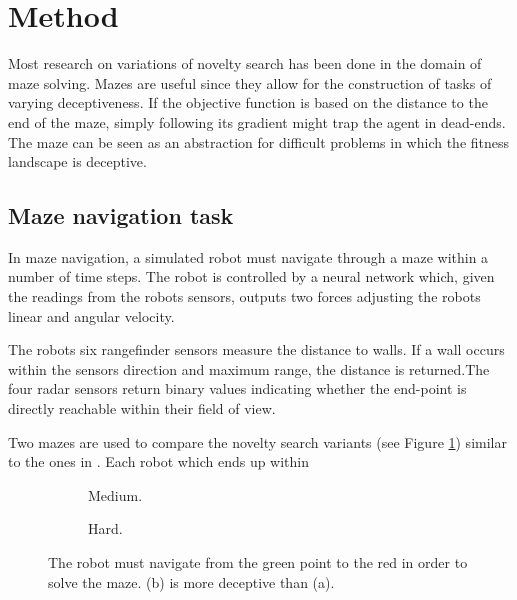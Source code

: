 \section{Method}
Most research on variations of novelty search has been done in the domain of maze solving. Mazes are useful
since they allow for the construction of tasks of varying deceptiveness. If the objective function is
based on the distance to the end of the maze, simply following its gradient might trap the agent in
dead-ends. The maze can be seen as an abstraction for difficult problems in which the fitness
landscape is deceptive.

\subsection{Maze navigation task}
In maze navigation, a simulated robot must navigate through a maze within a number of time steps.
The robot is controlled by a neural network which, given the readings from the robots sensors,
outputs two forces adjusting the robots linear and angular velocity.

The robots six rangefinder sensors measure the distance to walls. If a wall occurs within the sensors
direction and maximum range, the distance is returned.The four radar sensors return binary
values indicating whether the end-point is directly reachable within their field of view.

Two mazes are used to compare the novelty search variants (see Figure \ref{mazes}) similar to the ones in \cite{novelty_alone}.
Each robot which ends up within 

\begin{figure}[H]
    \captionsetup[subfigure]{justification=centering}
    \centering
    \begin{mdframed}
        \begin{subfigure}[b]{0.45\textwidth}
            \centering
            \hspace*{2em}\scalebox{0.3}{}
            \caption{Medium.}
        \end{subfigure}
        \begin{subfigure}[b]{0.5\textwidth}
            \centering
            \hspace*{5em}\scalebox{0.3}{}
            \caption{Hard.}
        \end{subfigure}
    \end{mdframed}
    \caption{The robot must navigate from the green point to the red in order to solve the maze.
             (b) is more deceptive than (a).}
    \label{mazes}
\end{figure}


